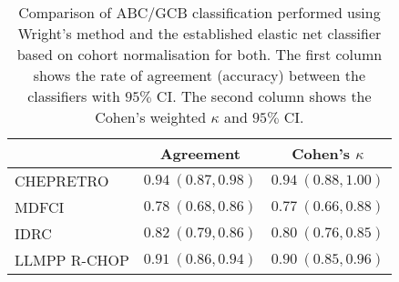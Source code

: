 \begin{table}[!tbp]
{\small
\caption{Comparison of ABC/GCB classification performed using Wright's
method and the established elastic net classifier based on cohort normalisation
for both. The first column shows the rate of agreement (accuracy) between the
classifiers with $95\%$ CI. The second column shows the Cohen's weighted
$\kappa$ and $95\%$ CI.\label{tab:ABCGCBclassifier}} 
\begin{center}
\begin{tabular}{lll}
\hline\hline
\multicolumn{1}{l}{}&\multicolumn{1}{c}{Agreement}&\multicolumn{1}{c}{Cohen's $\kappa$}\tabularnewline
\hline
CHEPRETRO&$0.94~(0.87, 0.98)$&$0.94~(0.88, 1.00)$\tabularnewline
MDFCI&$0.78~(0.68, 0.86)$&$0.77~(0.66, 0.88)$\tabularnewline
IDRC&$0.82~(0.79, 0.86)$&$0.80~(0.76, 0.85)$\tabularnewline
LLMPP R-CHOP&$0.91~(0.86, 0.94)$&$0.90~(0.85, 0.96)$\tabularnewline
\hline
\end{tabular}\end{center}}

\end{table}
